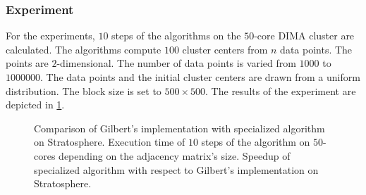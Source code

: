 \subsubsection{Experiment}

For the experiments, $10$ steps of the \kmeans algorithms on the $50$-core DIMA cluster are calculated.
The algorithms compute $100$ cluster centers from $n$ data points.
The points are $2$-dimensional.
The number of data points is varied from $1000$ to $1000000$.
The data points and the initial cluster centers are drawn from a uniform distribution.
The block size is set to $500\times 500$.
The results of the experiment are depicted in \cref{fig:kmeansResult}.

\begin{figure}
	\centering
	\begin{subfigure}[h]{\dualpgfwidth}
		\caption{}
		\label{fig:kmeansResult}
	\end{subfigure}
	\begin{subfigure}[h]{\dualpgfwidth}
		\caption{}
		\label{fig:kmeansSpeedup}
	\end{subfigure}
	\caption{Comparison of Gilbert's \kmeans implementation with specialized algorithm on Stratosphere.  Execution time of $10$ steps of the \kmeans algorithm on $50$-cores depending on the adjacency matrix's size.  Speedup of specialized algorithm with respect to Gilbert's implementation on Stratosphere.}
	\label{fig:kmeansBenchmark}
\end{figure}

